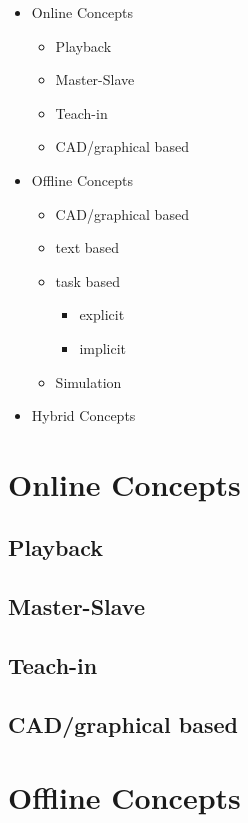 \documentclass[conference]{IEEEtran}
\begin{document}
 \begin{itemize}
    \item Online Concepts
        \begin{itemize}
            \item Playback
            \item Master-Slave
            \item Teach-in
            \item CAD/graphical based
        \end{itemize}
    \item Offline Concepts
        \begin{itemize}
            \item CAD/graphical based
            \item text based
            \item task based
                \begin{itemize}
                    \item explicit
                    \item implicit
                \end{itemize}
            \item Simulation
        \end{itemize}
    \item Hybrid Concepts
 \end{itemize}    

\section{Online Concepts}


    \subsection{Playback}
    \subsection{Master-Slave}
    \subsection{Teach-in}
    \subsection{CAD/graphical based}

\section{Offline Concepts}
\end{document}
